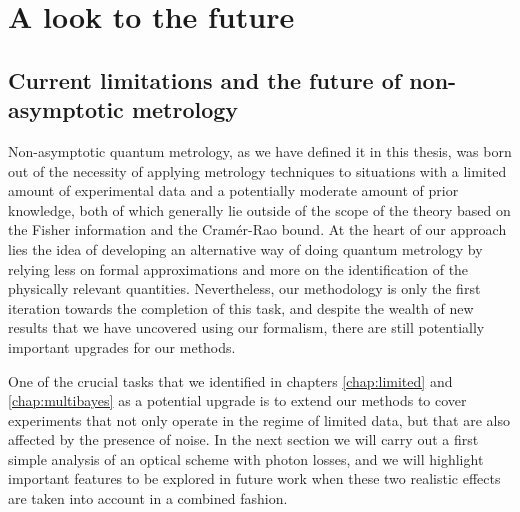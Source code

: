 \chapter{A look to the future}
\label{chap:future}

\section{Current limitations and the future of non-asymptotic metrology}

Non-asymptotic quantum metrology, as we have defined it in this thesis, was born out of the necessity of applying metrology techniques to situations with a limited amount of experimental data and a potentially moderate amount of prior knowledge, both of which generally lie outside of the scope of the theory based on the Fisher information and the Cram\'{e}r-Rao bound. At the heart of our approach lies the idea of developing an alternative way of doing quantum metrology by relying less on formal approximations and more on the identification of the physically relevant quantities. Nevertheless, our methodology is only the first iteration towards the completion of this task, and despite the wealth of new results that we have uncovered using our formalism, there are still potentially important upgrades for our methods.

One of the crucial tasks that we identified in chapters \ref{chap:limited} and \ref{chap:multibayes} as a potential upgrade is to extend our methods to cover experiments that not only operate in the regime of limited data, but that are also affected by the presence of noise. In the next section we will carry out a first simple analysis of an optical scheme with photon losses, and we will highlight important features to be explored in future work when these two realistic effects are taken into account in a combined fashion. 

